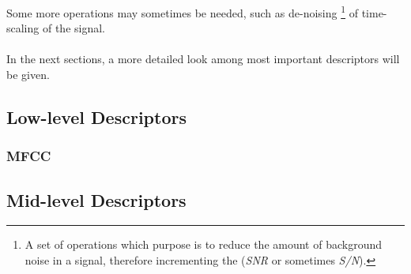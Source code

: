 Some more operations may sometimes be needed, such as de-noising \footnote{A set of operations which purpose is to reduce the amount of background noise in a signal, therefore incrementing the  (\textit{SNR} or sometimes \textit{S/N}).} of time-scaling of the signal. \\
\\In the next sections, a more detailed look among most important descriptors will be given.

\subsection{Low-level Descriptors}
\subsubsection{MFCC}


\subsection{Mid-level Descriptors}
